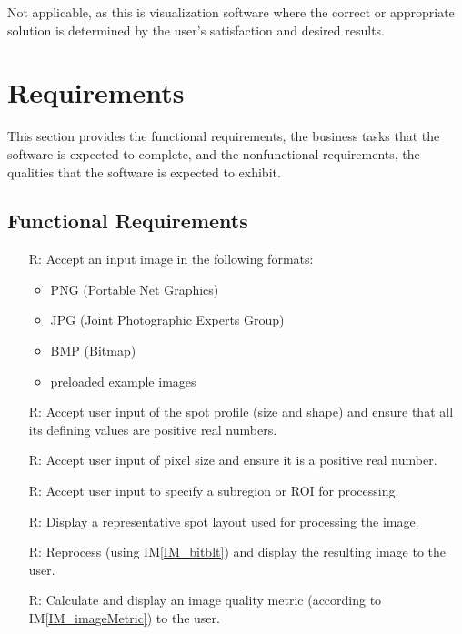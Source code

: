 \documentclass[12pt]{article}
\newcommand{\iref}[1]{IM\ref{#1}}
\newcounter{reqnum} %
\begin{document}
\noindent
Not applicable, as this is visualization software where the correct or 
appropriate solution is determined by the user's satisfaction and desired results.

\newpage
\section{Requirements}

This section provides the functional requirements, the business tasks that the
software is expected to complete, and the nonfunctional requirements, the
qualities that the software is expected to exhibit.

\subsection{Functional Requirements}

\noindent \begin{itemize}

\item[R\refstepcounter{reqnum}\thereqnum \label{R_Inputs}:] Accept an input 
image in the following formats:

  \noindent \begin{itemize}
    \item PNG (Portable Net Graphics)
    \item JPG (Joint Photographic Experts Group)
    \item BMP (Bitmap)
    \item preloaded example images
  \end{itemize}

\item[R\refstepcounter{reqnum}\thereqnum \label{R_userSpotProfile}:] Accept user 
input of the spot profile (size and shape) and ensure that all its defining 
values are positive real numbers.

\item[R\refstepcounter{reqnum}\thereqnum \label{R_userPixelSize}:] Accept user 
input of pixel size and ensure it is a positive real number.

\item[R\refstepcounter{reqnum}\thereqnum \label{R_subregion}:] Accept user
input to specify a subregion or ROI for processing.

\item[R\refstepcounter{reqnum}\thereqnum \label{R_spotLayout}:] Display a 
representative spot layout used for processing the image.

\item[R\refstepcounter{reqnum}\thereqnum \label{R_resultImage}:] Reprocess 
(using \iref{IM_bitblt}) and display the resulting image to the user.

\item[R\refstepcounter{reqnum}\thereqnum \label{R_imageMetric}:] Calculate and 
display an image quality metric (according to \iref{IM_imageMetric}) to the user.

\end{itemize}
\end{document}
